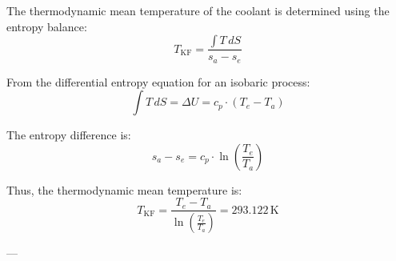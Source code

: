 The thermodynamic mean temperature of the coolant is determined using the entropy balance:  
\[
T_{\text{KF}} = \frac{\int T \, dS}{s_a - s_e}
\]  

From the differential entropy equation for an isobaric process:  
\[
\int T \, dS = \Delta U = c_p \cdot (T_e - T_a)
\]  

The entropy difference is:  
\[
s_a - s_e = c_p \cdot \ln\left(\frac{T_e}{T_a}\right)
\]  

Thus, the thermodynamic mean temperature is:  
\[
T_{\text{KF}} = \frac{T_e - T_a}{\ln\left(\frac{T_e}{T_a}\right)} = 293.122 \, \text{K}
\]  

---